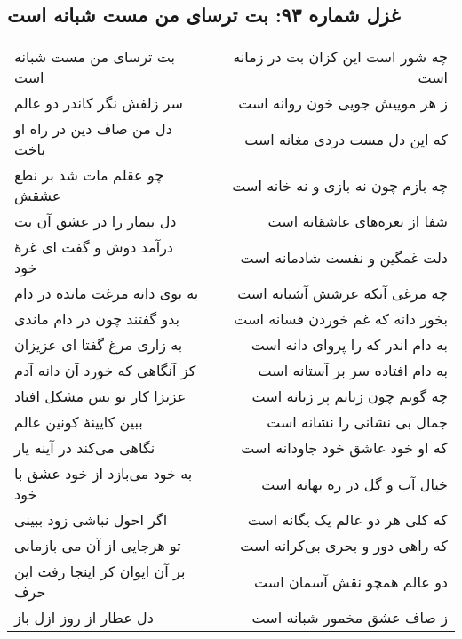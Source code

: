 \begin{center}
\section*{غزل شماره ۹۳: بت ترسای من مست شبانه است}
\label{sec:093}
\begin{longtable}{l p{0.5cm} r}
بت ترسای من مست شبانه است
&&
چه شور است این کزان بت در زمانه است
\\
سر زلفش نگر کاندر دو عالم
&&
ز هر موییش جویی خون روانه است
\\
دل من صاف دین در راه او باخت
&&
که این دل مست دردی مغانه است
\\
چو عقلم مات شد بر نطع عشقش
&&
چه بازم چون نه بازی و نه خانه است
\\
دل بیمار را در عشق آن بت
&&
شفا از نعره‌های عاشقانه است
\\
درآمد دوش و گفت ای غرهٔ خود
&&
دلت غمگین و نفست شادمانه است
\\
به بوی دانه مرغت مانده در دام
&&
چه مرغی آنکه عرشش آشیانه است
\\
بدو گفتند چون در دام ماندی
&&
بخور دانه که غم خوردن فسانه است
\\
به زاری مرغ گفتا ای عزیزان
&&
به دام اندر که را پروای دانه است
\\
کز آنگاهی که خورد آن دانه آدم
&&
به دام افتاده سر بر آستانه است
\\
عزیزا کار تو بس مشکل افتاد
&&
چه گویم چون زبانم پر زبانه است
\\
ببین کایینهٔ کونین عالم
&&
جمال بی نشانی را نشانه است
\\
نگاهی می‌کند در آینه یار
&&
که او خود عاشق خود جاودانه است
\\
به خود می‌بازد از خود عشق با خود
&&
خیال آب و گل در ره بهانه است
\\
اگر احول نباشی زود ببینی
&&
که کلی هر دو عالم یک یگانه است
\\
تو هرجایی از آن می بازمانی
&&
که راهی دور و بحری بی‌کرانه است
\\
بر آن ایوان کز اینجا رفت این حرف
&&
دو عالم همچو نقش آسمان است
\\
دل عطار از روز ازل باز
&&
ز صاف عشق مخمور شبانه است
\\
\end{longtable}
\end{center}
